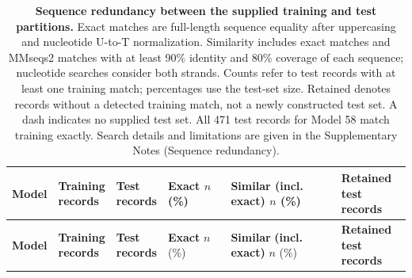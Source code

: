 \begingroup
\small
\setlength{\tabcolsep}{3pt}
\renewcommand{\arraystretch}{1.15}
\setlength{\LTleft}{0pt}
\setlength{\LTright}{0pt}
\setlength{\LTcapwidth}{\linewidth}
\begin{longtable}{@{}>{\raggedright\arraybackslash}p{}>{\centering\arraybackslash}p{}>{\centering\arraybackslash}p{}>{\centering\arraybackslash}p{}>{\centering\arraybackslash}p{}>{\centering\arraybackslash}p{}@{}}
\caption{\textbf{Sequence redundancy between the supplied training and test partitions.} Exact matches are full-length sequence equality after uppercasing and nucleotide U-to-T normalization. Similarity includes exact matches and MMseqs2 matches with at least 90\% identity and 80\% coverage of each sequence; nucleotide searches consider both strands. Counts refer to test records with at least one training match; percentages use the test-set size. Retained denotes records without a detected training match, not a newly constructed test set. A dash indicates no supplied test set. All 471 test records for Model 58 match training exactly. Search details and limitations are given in the Supplementary Notes (Sequence redundancy).}\label{tab:sequence_overlap}\\
\toprule
\textbf{Model} & \shortstack{\textbf{Training}\\\textbf{records}} & \shortstack{\textbf{Test}\\\textbf{records}} & \shortstack{\textbf{Exact}\\$n$ (\%)} & \shortstack{\textbf{Similar}\\\textbf{(incl. exact)}\\$n$ (\%)} & \shortstack{\textbf{Retained}\\\textbf{test records}} \\
\midrule
\endfirsthead
\toprule
\textbf{Model} & \shortstack{\textbf{Training}\\\textbf{records}} & \shortstack{\textbf{Test}\\\textbf{records}} & \shortstack{\textbf{Exact}\\$n$ (\%)} & \shortstack{\textbf{Similar}\\\textbf{(incl. exact)}\\$n$ (\%)} & \shortstack{\textbf{Retained}\\\textbf{test records}} \\

\end{longtable}
